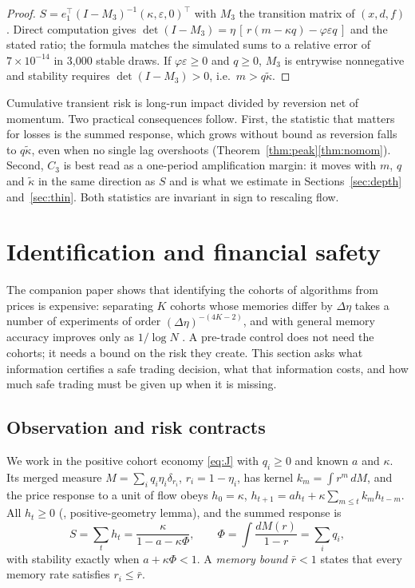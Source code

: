 \documentclass[12pt]{article}
\theoremstyle{definition}
\theoremstyle{remark}
\begin{document}
\begin{proof}
$S=e_1^\top(I-M_3)^{-1}(\kappa,\varepsilon,0)^\top$ with $M_3$ the transition matrix of $(x,d,f)$. Direct computation gives $\det(I-M_3)=\eta\,[\,r(m-\kappa q)-\varphi\varepsilon q\,]$ and the stated ratio; the formula matches the simulated sums to a relative error of $7\times10^{-14}$ in 3{,}000 stable draws. If $\varphi\varepsilon\ge0$ and $q\ge0$, $M_3$ is entrywise nonnegative and stability requires $\det(I-M_3)>0$, i.e.\ $m>q\tilde\kappa$.
\end{proof}

Cumulative transient risk is long-run impact divided by reversion net of momentum. Two practical consequences follow. First, the statistic that matters for losses is the summed response, which grows without bound as reversion falls to $q\tilde\kappa$, even when no single lag overshoots (Theorem~\ref{thm:peak}\ref{thm:nomom}). Second, $C_3$ is best read as a one-period amplification margin: it moves with $m$, $q$ and $\tilde\kappa$ in the same direction as $S$ and is what we estimate in Sections~\ref{sec:depth} and~\ref{sec:thin}. Both statistics are invariant in sign to rescaling flow.
\section{Identification and financial safety}\label{sec:infosafety}

The companion paper shows that identifying the cohorts of algorithms from prices is expensive: separating $K$ cohorts whose memories differ by $\Delta\eta$ takes a number of experiments of order $(\Delta\eta)^{-(4K-2)}$, and with general memory accuracy improves only as $1/\log N$ \citep{niroula2026}. A pre-trade control does not need the cohorts; it needs a bound on the risk they create. This section asks what information certifies a safe trading decision, what that information costs, and how much safe trading must be given up when it is missing.

\subsection{Observation and risk contracts}\label{sec:contracts}
We work in the positive cohort economy \eqref{eq:J} with $q_i\ge0$ and known $a$ and $\kappa$. Its merged measure $M=\sum_iq_i\eta_i\delta_{r_i}$, $r_i=1-\eta_i$, has kernel $k_m=\int r^m\,dM$, and the price response to a unit of flow obeys $h_0=\kappa$, $h_{t+1}=ah_t+\kappa\sum_{m\le t}k_mh_{t-m}$. All $h_t\ge0$ (\citealp{niroula2026}, positive-geometry lemma), and the summed response is
\begin{equation}\label{eq:SPhi}
S=\sum_th_t=\frac{\kappa}{1-a-\kappa\Phi},\qquad \Phi=\int\frac{dM(r)}{1-r}=\sum_iq_i ,
\end{equation}
with stability exactly when $a+\kappa\Phi<1$. A \emph{memory bound} $\bar r<1$ states that every memory rate satisfies $r_i\le\bar r$.
\end{document}
